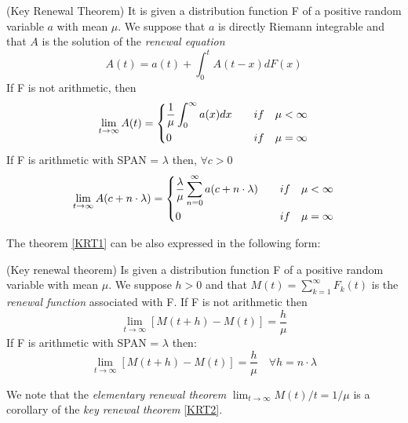 \begin{theorem}
	(Key Renewal Theorem) It is given a distribution function F of a positive random variable $a$ with mean $\mu$. We suppose that $a$ is directly Riemann integrable and that $A$ is the solution of the \textit{renewal equation}
	\begin{equation}
		A(t)=a(t)+\int_{0}^{t}A(t-x)dF(x)
	\end{equation}
	If F is not arithmetic, then
	\begin{equation*}
		\lim_{t \rightarrow \infty} A(t) =
		\begin{dcases}
			\frac{1}{\mu} \int_{0}^{\infty}a(x)dx \quad & if \quad \mu < \infty \\
			0 \quad & if \quad \mu = \infty
		\end{dcases}
	\end{equation*}
	If F is arithmetic with SPAN = $\lambda$ then, $\forall c > 0$
	\begin{equation*}
		\lim_{t \rightarrow \infty} A(c+n\cdot \lambda) =
		\begin{dcases}
			\frac{\lambda}{\mu} \sum_{n=0}^{\infty}a(c+n \cdot \lambda) \quad & if 	\quad \mu<\infty \\
			0 \quad & if \quad \mu = \infty
		\end{dcases}
	\end{equation*}
\label{KRT1}
\end{theorem}

The theorem \ref{KRT1} can be also expressed in the following form:

\begin{theorem}
	(Key renewal theorem) Is given a distribution function F of a positive random variable with mean $\mu$. We suppose $h>0$ and that $M(t)=\sum_{k=1}^\infty F_{k}(t)$ is the \textit{renewal function} associated with F.
	If F is not arithmetic then
	\begin{equation}
		\lim_{t \rightarrow \infty} [M(t+h)-M(t)]=\frac{h}{\mu}
	\end{equation}
	If F is arithmetic with SPAN = $\lambda$ then:
	\begin{equation}
		\lim_{t \rightarrow \infty} [M(t+h)-M(t)]=\frac{h}{\mu} \quad \forall h = n \cdot \lambda
	\end{equation}
	\label{KRT2}
\end{theorem}

We note that the \textit{elementary renewal theorem} $\lim_{t \to \infty} M(t) / t = 1 / \mu$ is a corollary of the \textit{key renewal theorem} \ref{KRT2}.

